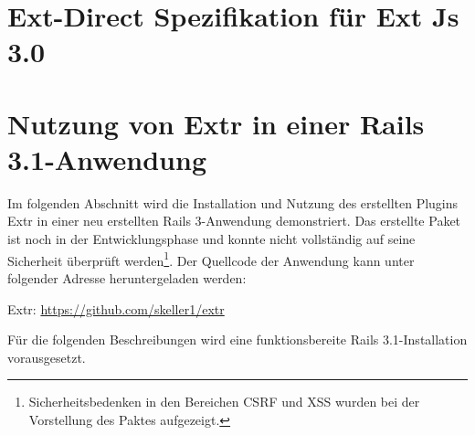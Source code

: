 

\section{Ext-Direct Spezifikation für Ext Js 3.0}
\label{extspec}


\section{Nutzung von Extr in einer Rails 3.1-Anwendung}


Im folgenden Abschnitt wird die Installation und Nutzung des erstellten Plugins Extr in einer neu erstellten Rails 3-Anwendung demonstriert. Das erstellte Paket ist noch in der Entwicklungsphase und konnte nicht vollständig auf seine Sicherheit überprüft werden\footnote{Sicherheitsbedenken in den Bereichen CSRF und XSS wurden bei der Vorstellung des Paktes aufgezeigt.}. Der Quellcode der Anwendung kann unter folgender Adresse heruntergeladen werden:

Extr: \href{https://github.com/skeller1/extr}{https://github.com/skeller1/extr}

Für die folgenden Beschreibungen wird eine funktionsbereite Rails 3.1-Installation vorausgesetzt.

